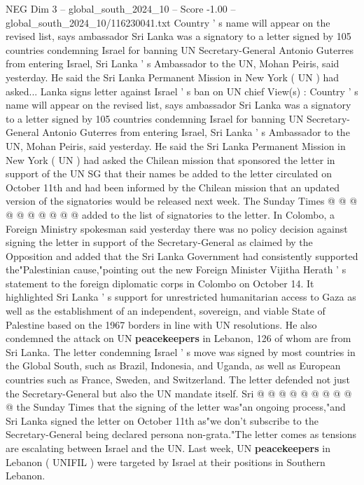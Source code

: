 \begin{textsample}{NEG Dim 3 – global\_south\_2024\_10 – Score -1.00 – global\_south\_2024\_10/116230041.txt}  \label{ex:f3_neg_060}
Country ' s name will appear on the revised list, says ambassador Sri Lanka was a signatory to a letter signed by 105 countries condemning Israel for banning UN Secretary-General Antonio Guterres from entering Israel, Sri Lanka ' s Ambassador to the UN, Mohan Peiris, said yesterday.
He said the Sri Lanka Permanent Mission in New York ( UN ) had asked...
Lanka signs letter against Israel ' s ban on UN chief View(s) : Country ' s name will appear on the revised list, says ambassador Sri Lanka was a signatory to a letter signed by 105 countries condemning Israel for banning UN Secretary-General Antonio Guterres from entering Israel, Sri Lanka ' s Ambassador to the UN, Mohan Peiris, said yesterday.
He said the Sri Lanka Permanent Mission in New York ( UN ) had asked the Chilean mission that sponsored the letter in support of the UN SG that their names be added to the letter circulated on October 11th and had been informed by the Chilean mission that an updated version of the signatories would be released next week.
The Sunday Times @ @ @ @ @ @ @ @ @ @ added to the list of signatories to the letter.
In Colombo, a Foreign Ministry spokesman said yesterday there was no policy decision against signing the letter in support of the Secretary-General as claimed by the Opposition and added that the Sri Lanka Government had consistently supported the"Palestinian cause,"pointing out the new Foreign Minister Vijitha Herath ' s statement to the foreign diplomatic corps in Colombo on October 14.
It highlighted Sri Lanka ' s support for unrestricted humanitarian access to Gaza as well as the establishment of an independent, sovereign, and viable State of Palestine based on the 1967 borders in line with UN resolutions.
He also condemned the attack on UN \textbf{peacekeepers} in Lebanon, 126 of whom are from Sri Lanka.
The letter condemning Israel ' s move was signed by most countries in the Global South, such as Brazil, Indonesia, and Uganda, as well as European countries such as France, Sweden, and Switzerland.
The letter defended not just the Secretary-General but also the UN mandate itself.
Sri @ @ @ @ @ @ @ @ @ @ the Sunday Times that the signing of the letter was"an ongoing process,"and Sri Lanka signed the letter on October 11th as"we don't subscribe to the Secretary-General being declared persona non-grata."The letter comes as tensions are escalating between Israel and the UN.
Last week, UN \textbf{peacekeepers} in Lebanon ( UNIFIL ) were targeted by Israel at their positions in Southern Lebanon.

\end{textsample}
